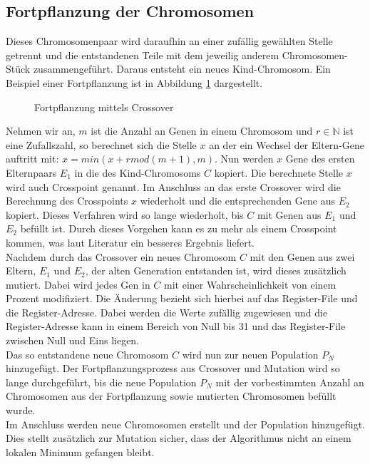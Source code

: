 \subsection{Fortpflanzung der Chromosomen}
Dieses Chromosomenpaar wird daraufhin an einer zufällig gewählten Stelle getrennt und die entstandenen Teile mit dem jeweilig anderem Chromosomen-Stück zusammengeführt. Daraus entsteht ein neues Kind-Chromosom. Ein Beispiel einer Fortpflanzung ist in Abbildung \ref{fig:crossover} dargestellt.
\begin{figure}[H] 
	\centering
	
	\caption{Fortpflanzung mittels Crossover}
	\label{fig:crossover}
\end{figure}
Nehmen wir an, $m$ ist die Anzahl an Genen in einem Chromosom und $r \in \mathbb{N}$ ist eine Zufallszahl, so berechnet sich die Stelle $x$ an der ein Wechsel der Eltern-Gene auftritt mit: $x= min(x+r mod(m+1),m)$. Nun werden $x$ Gene des ersten Elternpaars $E_1$ in die des Kind-Chromosoms $C$ kopiert. Die berechnete Stelle $x$ wird auch Crosspoint genannt. Im Anschluss an das erste Crossover wird die Berechnung des Crosspoints $x$ wiederholt und die entsprechenden Gene aus $E_2$ kopiert. Dieses Verfahren wird so lange wiederholt, bis $C$ mit Genen aus $E_1$ und $E_2$ befüllt ist. Durch dieses Vorgehen kann es zu mehr als einem Crosspoint kommen, was laut Literatur ein besseres Ergebnis liefert.\cite{reeves2003genetic} \\
Nachdem durch das Crossover ein neues Chromosom $C$ mit den Genen aus zwei Eltern, $E_1$ und $E_2$, der alten Generation entstanden ist, wird dieses zusätzlich mutiert. Dabei wird jedes Gen in $C$ mit einer Wahrscheinlichkeit von einem Prozent modifiziert. Die Änderung bezieht sich hierbei auf das Register-File und die Register-Adresse. Dabei werden die Werte zufällig zugewiesen und die Register-Adresse kann in einem Bereich von Null bis 31 und das Register-File zwischen Null und Eins liegen.\\
Das so entstandene neue Chromosom $C$ wird nun zur neuen Population $P_N$ hinzugefügt. Der Fortpflanzungsprozess aus Crossover und Mutation wird so lange durchgeführt, bis die neue Population $P_N$ mit der vorbestimmten Anzahl an Chromosomen aus der Fortpflanzung sowie mutierten Chromosomen befüllt wurde.\\
Im Anschluss werden neue Chromosomen erstellt und der Population hinzugefügt. Dies stellt zusätzlich zur Mutation sicher, dass der Algorithmus nicht an einem lokalen Minimum gefangen bleibt. 


